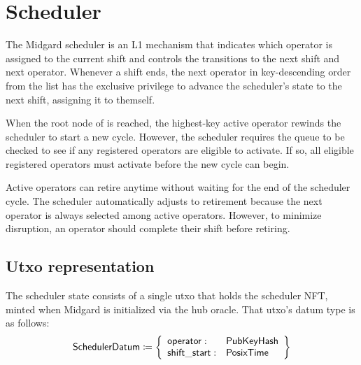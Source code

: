 \documentclass[../midgard.tex]{subfiles}
\begin{document}
\section{Scheduler}
\label{h:scheduler}

The Midgard scheduler is an L1 mechanism that indicates which operator is assigned to the current shift and controls the transitions to the next shift and next operator.
Whenever a shift ends, the next operator in key-descending order from the  list has the exclusive privilege to advance the scheduler's state to the next shift, assigning it to themself.

When the root node of  is reached, the highest-key active operator rewinds the scheduler to start a new cycle.
However, the scheduler requires the  queue to be checked to see if any registered operators are eligible to activate.
If so, all eligible registered operators must activate before the new cycle can begin.

Active operators can retire anytime without waiting for the end of the scheduler cycle.
The scheduler automatically adjusts to retirement because the next operator is always selected among active operators.
However, to minimize disruption, an operator should complete their shift before retiring.

\todo

\subsection{Utxo representation}
\label{h:scheduler-utxo-representation}

The scheduler state consists of a single utxo that holds the scheduler NFT, minted when Midgard is initialized via the hub oracle.
That utxo's datum type is as follows:
\begin{equation*}
    \mathsf{SchedulerDatum} \coloneq \left\{
    \begin{array}{ll}
        \mathsf{operator}  : & \mathsf{PubKeyHash} \\
        \mathsf{shift\_start} : & \mathsf{PosixTime}
    \end{array} \right\}
\end{equation*}
\end{document}
